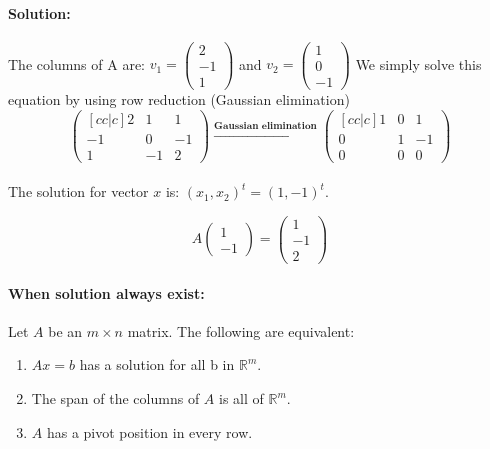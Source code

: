 \documentclass[a4paper,12pt]{article}
\begin{document}
\paragraph{Solution:} The columns of A are:
\(v_1 = \begin{pmatrix}
    2\\-1\\1
\end{pmatrix}\) and \(v_2 = \begin{pmatrix}
    1\\0\\-1
\end{pmatrix}\)
We simply solve this equation by using row reduction (Gaussian elimination)\\

\[
\begin{pmatrix} [cc|c]
    2 & 1 & 1 \\
   -1 & 0 & -1 \\
   1 & -1 & 2
\end{pmatrix}
\xrightarrow{\textbf{Gaussian elimination}} 
\begin{pmatrix} [cc|c]
    1 & 0 & 1 \\
   0 & 1 & -1 \\
   0 & 0 & 0
\end{pmatrix}
\]\\
The solution for vector \( x \) is: \( (x_1, x_2)^t = (1, -1)^t \).

\[
A \begin{pmatrix} 1 \\ -1 \end{pmatrix} = \begin{pmatrix} 1 \\ -1 \\ 2 \end{pmatrix}
\]
\paragraph{When solution always exist:\\}Let \(A\) be an \(m \times n\) matrix. The following are equivalent:
\begin{enumerate}
    \item \(Ax = b\) has a solution for all b in \(\mathbb{R}^m\).
    \item The span of the columns of \(A\) is all of \(\mathbb{R}^m\).
    \item \(A\) has a pivot position in every row.
\end{enumerate}
\end{document}
